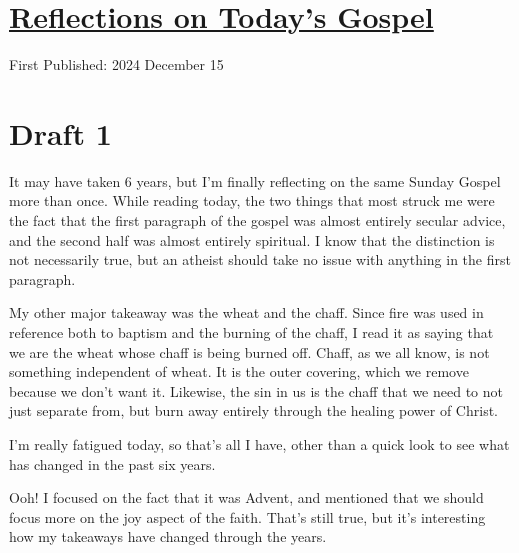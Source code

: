 \documentclass[12pt]{article}[titlepage]
\newcommand{\1}{\={a}}
\newcommand{\2}{\={e}}
\newcommand{\3}{\={\i}}
\newcommand{\4}{\=o}
\newcommand{\5}{\=u}
\newcommand{\6}{\={A}}
\renewcommand{\,}{\textsuperscript{,}}
\begin{document}
\doublespacing
\section{\href{reflections-on-readings-3-advent-c-24.html}{Reflections on Today's Gospel}}
First Published: 2024 December 15

\section{Draft 1}

It may have taken 6 years, but I'm finally reflecting on the same Sunday Gospel more than once.  
While reading today, the two things that most struck me were the fact that the first paragraph of the gospel was almost entirely secular advice, and the second half was almost entirely spiritual.  
I know that the distinction is not necessarily true, but an atheist should take no issue with anything in the first paragraph.

My other major takeaway was the wheat and the chaff. Since fire was used in reference both to baptism and the burning of the chaff, I read it as saying that we are the wheat whose chaff is being burned off.  
Chaff, as we all know, is not something independent of wheat. It is the outer covering, which we remove because we don't want it.  
Likewise, the sin in us is the chaff that we need to not just separate from, but burn away entirely through the healing power of Christ.

I'm really fatigued today, so that's all I have, other than a quick look to see what has changed in the past six years.

Ooh! I focused on the fact that it was Advent, and mentioned that we should focus more on the joy aspect of the faith.  
That's still true, but it's interesting how my takeaways have changed through the years.  
\end{document}
